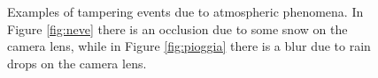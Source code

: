 \documentclass{llncs}
\begin{document}
\begin{figure}
	\centering
	\caption[Tampering examples]{Examples of tampering events due to atmospheric phenomena. In Figure \ref{fig:neve} there is an occlusion due to some snow on the camera lens, while in Figure \ref{fig:pioggia} there is a blur due to rain drops on the camera lens.}
	\label{fig:ROC}
\end{figure}
\end{document}
